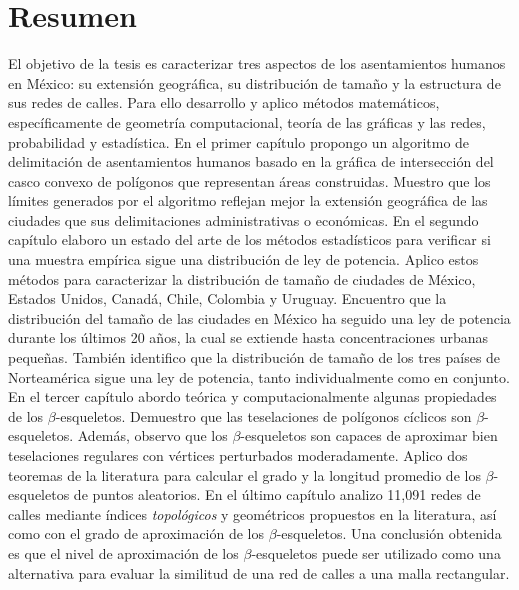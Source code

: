 \chapter{Resumen}

El objetivo de la tesis es caracterizar tres aspectos de los asentamientos humanos en México: su extensión geográfica, su distribución de tamaño y la estructura de sus redes de calles. Para ello desarrollo y aplico métodos matemáticos, específicamente de geometría computacional, teoría de las gráficas y las redes, probabilidad y estadística. En el primer capítulo propongo un algoritmo de delimitación de asentamientos humanos basado en la gráfica de intersección del casco convexo de polígonos que representan áreas construidas. Muestro que los límites generados por el algoritmo reflejan mejor la extensión geográfica de las ciudades que sus delimitaciones administrativas o económicas. En el segundo capítulo elaboro un estado del arte de los métodos estadísticos para verificar si una muestra empírica sigue una distribución de ley de potencia. Aplico estos métodos para caracterizar la distribución de tamaño de ciudades de México, Estados Unidos, Canadá, Chile, Colombia y Uruguay. Encuentro que la distribución del tamaño de las ciudades en México ha seguido una ley de potencia durante los últimos 20 años, la cual se extiende hasta concentraciones urbanas pequeñas. También identifico que la distribución de tamaño de los tres países de Norteamérica sigue una ley de potencia, tanto individualmente como en conjunto. En el tercer capítulo abordo teórica y computacionalmente algunas propiedades de los $\beta$-esqueletos. Demuestro que las teselaciones de polígonos cíclicos son $\beta$-esqueletos. Además, observo que los $\beta$-esqueletos son capaces de aproximar bien teselaciones regulares con vértices perturbados moderadamente. Aplico dos teoremas de la literatura para calcular el grado y la longitud promedio de los $\beta$-esqueletos de puntos aleatorios. En el último capítulo analizo 11,091 redes de calles mediante índices \textit{topológicos} y geométricos propuestos en la literatura, así como con el grado de aproximación de los $\beta$-esqueletos. Una conclusión obtenida es que el nivel de aproximación de los $\beta$-esqueletos puede ser utilizado como una alternativa para evaluar la similitud de una red de calles a una malla rectangular.
